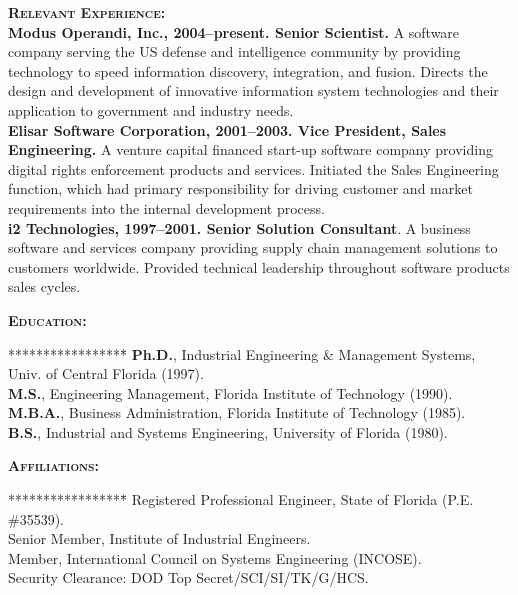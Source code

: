 \documentclass{sbir}
\begin{document}
{\begin{enumerate}
\end{enumerate}
\textbf{\textsc{Relevant Experience:}}~\\
{\bfseries Modus Operandi, Inc., 2004--present. Senior Scientist.} A software company serving the US defense and intelligence community by providing technology to speed information discovery, integration, and fusion. Directs the design and development of innovative information system technologies and their application to government and industry needs.~\\
{\bfseries Elisar Software Corporation, 2001--2003. Vice President, Sales Engineering.} A venture capital financed start-up software company providing digital rights enforcement products and services. Initiated the Sales Engineering function, which had primary responsibility for driving customer and market requirements into the internal development process.~\\
{\bfseries i2 Technologies, 1997--2001. Senior Solution Consultant}. A business software and services company providing supply chain management solutions to customers worldwide. Provided technical leadership throughout software products sales cycles.

\textbf{\textsc{Education:}}
\vspace{-30pt}
\begin{tabbing}*****************\=\kill
 \> {\bfseries Ph.D.}, Industrial Engineering \& Management Systems, Univ. of Central Florida (1997). \\
 \> {\bfseries M.S.}, Engineering Management, Florida Institute of Technology (1990). \\
 \> {\bfseries M.B.A.}, Business Administration, Florida Institute of Technology (1985). \\
 \> {\bfseries B.S.}, Industrial and Systems Engineering, University of Florida (1980).
\end{tabbing}

\textbf{\textsc{Affiliations:}}
\vspace{-30pt}
\begin{tabbing}*****************\=\kill
\> Registered Professional Engineer, State of Florida (P.E. \#35539). \\
\> Senior Member, Institute of Industrial Engineers. \\
\> Member, International Council on Systems Engineering (INCOSE). \\
\> Security Clearance: DOD Top Secret/SCI/SI/TK/G/HCS.
\end{tabbing}

}
\end{document}
